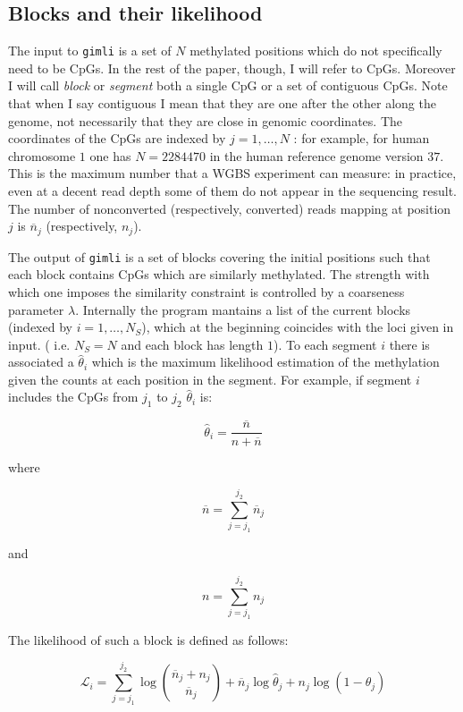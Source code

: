 \documentclass[12pt]{amsart}
\newcommand{\lik}{\ensuremath{\mathcal{L}}}
\newcommand{\gimli}{\texttt{gimli}}
\begin{document}
\subsection{Blocks and their likelihood}
The  input to \gimli{} is a set of $N$ methylated positions 
which do not specifically need to be CpGs.
In the rest of the paper, though, I will refer to CpGs. Moreover 
I will call {\em block} or {\em segment} 
both a single CpG or a set of contiguous CpGs. 
Note that when I say contiguous I mean that they are one
after the other along the genome, not necessarily that they are
close in genomic coordinates. The coordinates of the CpGs are 
indexed by $j=1,\dots,N$ : for example, for human chromosome $1$ 
one has $N = 2284470$ in the human reference genome version $37$.
This is the maximum number that a WGBS experiment can measure: in practice,
even at a decent read depth
some of them do not appear in the sequencing result. 
The number of nonconverted (respectively, converted) reads mapping at 
position $j$ is $\overline{n}_j$ (respectively, $n_j$). 

The output of \gimli{} is a set of blocks 
covering the initial positions 
such that each block contains CpGs which are similarly
methylated. The strength with which
one imposes the similarity constraint
is controlled by a coarseness parameter $\lambda$.
Internally the program  mantains a list of the current  
blocks (indexed by $i=1,\dots,N_S$), 
which at the beginning 
coincides with the loci given in input. 
( i.e.  $N_S=N$ and each block has length $1$). 
To each segment $i$ there is associated a $\hat{\theta}_i$ which
is the maximum likelihood estimation of the methylation given the counts
at each position in the segment. 
For example, if segment $i$ includes the CpGs from $j_1$ to $j_2$
$\hat{\theta}_i$ is:

\[
\hat{\theta}_i=\frac{\overline{n}}{n + \overline{n}}
\]

where

\[
\overline{n}=\sum_{j=j_1}^{j_2} \overline{n}_j
\]

and

\[
n=\sum_{j=j_1}^{j_2} n_j
\]

The likelihood of such a block is defined as follows:

\begin{equation}
\lik_i=\sum_{j=j_1}^{j_2} 
\log {\overline{n}_j+n_j \choose \overline{n}_j} +
	{\overline{n}_j}\log\hat{\theta}_j+
	n_j\log(1-\hat{\theta}_j)
\end{equation}
\label{loglik}
\end{document}
